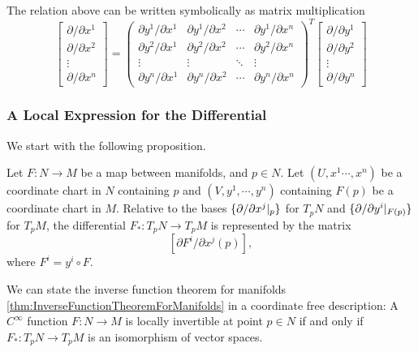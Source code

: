 \begin{remark}
	The relation above can be written symbolically as matrix multiplication
		\[ 
	\begin{bmatrix}
		\partial/\partial x^1 \\
		\partial/\partial x^2 \\
		\vdots \\
		\partial/\partial x^n
	\end{bmatrix} = 
	\begin{pmatrix}
		\partial y^1/\partial x^1 & \partial y^1/\partial x^2 &  \cdots & \partial y^1/\partial x^n \\
		\partial y^2/\partial x^1 & \partial y^2/\partial x^2 &  \cdots & \partial y^2/\partial x^n \\
		\vdots & \vdots & \ddots & \vdots \\
		\partial y^n/\partial x^1 & \partial y^n/\partial x^2 &  \cdots & \partial y^n/\partial x^n
	\end{pmatrix}^T
	\begin{bmatrix}
		\partial/\partial y^1 \\
		\partial/\partial y^2 \\
		\vdots \\
		\partial/\partial y^n
	\end{bmatrix}
	\]
\end{remark}


\subsubsection{A Local Expression for the Differential}
We start with the following proposition.
\begin{proposition}
	Let $ F: N\to M $ be a map between manifolds, and $ p \in N $. Let $ (U,x^1\cdots,x^n) $ be a coordinate chart in $ N $ containing $ p $ and $ (V,y^1,\cdots,y^n) $ containing $ F(p) $ be a coordinate chart in $ M $. Relative to the bases $ \{\partial /\partial x^j|_{p}\} $ for $ T_pN $ and $ \{\partial/\partial y^i|_{F(p)}\} $ for $ T_pM $, the differential $ F_*: T_pN \to T_pM $ is represented by the matrix
	\[ [\partial F^i/\partial x^j(p)], \]
	where $ F^i = y^i \circ F $.
\end{proposition}
\begin{remark}
	We can state the inverse function theorem for manifolds \autoref{thm:InverseFunctionTheoremForManifolds} in a coordinate free description: A $ C^\infty $ function $ F:N\to M $ is locally invertible at point $ p\in N $ if and only if $ F_*: T_pN \to T_pM $ is an isomorphism of vector spaces.
\end{remark}


